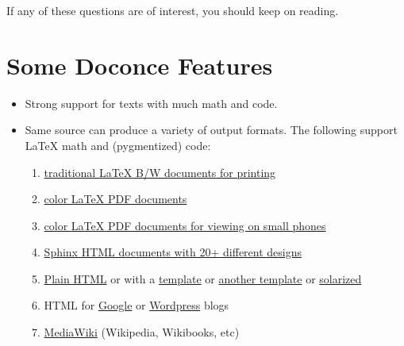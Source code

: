 \documentclass[%
oneside,                 %
final,                   %
10pt]{article}
\begin{document}
\noindent
If any of these questions are of interest, you should keep on reading.


\section{Some Doconce Features}

\begin{itemize}
 \item Strong support for texts with much math and code.

 \item Same source can produce a variety of output formats.
   The following support {\LaTeX} math and (pygmentized) code:
\begin{enumerate}

  \item \href{{http://hplgit.github.com/teamods/writing_reports/_static/report_4printing.pdf}}{traditional {\LaTeX} B/W documents for printing}

  \item \href{{http://hplgit.github.com/teamods/writing_reports/_static/report.pdf}}{color {\LaTeX} PDF documents}

  \item \href{{http://hplgit.github.com/teamods/writing_reports/_static/report_4phone.pdf}}{color {\LaTeX} PDF documents for viewing on small phones}

  \item \href{{http://hplgit.github.com/teamods/writing_reports/_static/sphinx-fenics_minimal/report.html}}{Sphinx HTML documents with 20+ different designs}

  \item \href{{http://hplgit.github.com/teamods/writing_reports/_static/report.html}}{Plain HTML} or with a \href{{http://hplgit.github.com/teamods/writing_reports/_static/report_vagrant.html}}{template} or \href{{http://hplgit.github.com/teamods/writing_reports/_static/report_github_minimal.html}}{another template} or \href{{http://hplgit.github.com/teamods/writing_reports/_static/report_solarized.html}}{solarized}

  \item HTML for \href{{http://doconce-report-demo.blogspot.no/}}{Google} or \href{{http://doconcereportdemo.wordpress.com/}}{Wordpress} blogs

  \item \href{{http://doconcedemo.shoutwiki.com/wiki/Doconce_demo_page}}{MediaWiki} (Wikipedia, Wikibooks, etc)


\end{enumerate}
\end{itemize}
\end{document}
